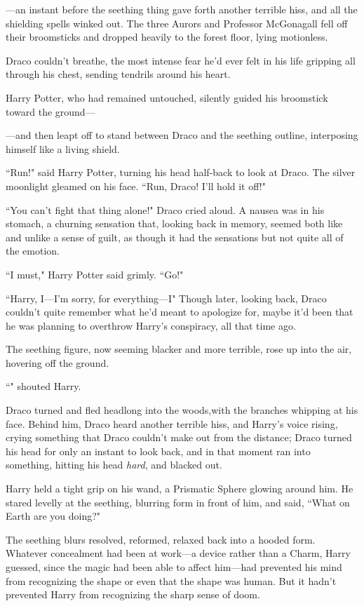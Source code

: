 \begin{em}
—an instant before the seething thing gave forth another terrible hiss, and all the shielding spells winked out. The three Aurors and Professor McGonagall fell off their broomsticks and dropped heavily to the forest floor, lying motionless.

Draco couldn't breathe, the most intense fear he'd ever felt in his life gripping all through his chest, sending tendrils around his heart.

Harry Potter, who had remained untouched, silently guided his broomstick toward the ground—

—and then leapt off to stand between Draco and the seething outline, interposing himself like a living shield.

``Run!" said Harry Potter, turning his head half-back to look at Draco. The silver moonlight gleamed on his face. ``Run, Draco! I'll hold it off!"

``You can't fight that thing alone!" Draco cried aloud. A nausea was in his stomach, a churning sensation that, looking back in memory, seemed both like and unlike a sense of guilt, as though it had the sensations but not quite all of the emotion.

``I must," Harry Potter said grimly. ``Go!"

``Harry, I—I'm sorry, for everything—I" Though later, looking back, Draco couldn't quite remember what he'd meant to apologize for, maybe it'd been that he was planning to overthrow Harry's conspiracy, all that time ago.

The seething figure, now seeming blacker and more terrible, rose up into the air, hovering off the ground.

``" shouted Harry.

Draco turned and fled headlong into the woods,with the branches whipping at his face. Behind him, Draco heard another terrible hiss, and Harry's voice rising, crying something that Draco couldn't make out from the distance; Draco turned his head for only an instant to look back, and in that moment ran into something, hitting his head \emph{hard}, and blacked out.
\end{em}

\later

Harry held a tight grip on his wand, a Prismatic Sphere glowing around him. He stared levelly at the seething, blurring form in front of him, and said, ``What on Earth are you doing?"

The seething blurs resolved, reformed, relaxed back into a hooded form. Whatever concealment had been at work—a device rather than a Charm, Harry guessed, since the magic had been able to affect him—had prevented his mind from recognizing the shape or even that the shape was human. But it hadn't prevented Harry from recognizing the sharp sense of doom.

